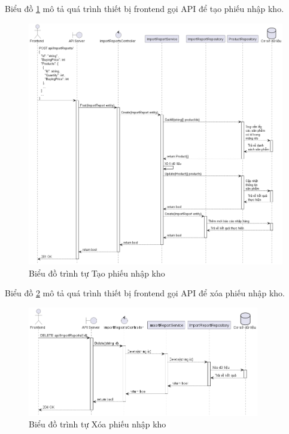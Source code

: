 \documentclass[../DoAn.tex]{subfiles}
\begin{document}
Biểu đồ \ref{figure:sd-importreport-post} mô tả quá trình thiết bị frontend gọi API để tạo phiếu nhập kho.
\begin{figure}[H]
    \centering
    \includegraphics[width=1\textwidth]{Hinhve/design/class/ImportReportPOSTSequence}
    \caption{Biểu đồ trình tự Tạo phiếu nhập kho}
    \label{figure:sd-importreport-post}
\end{figure}

Biểu đồ \ref{figure:sd-importreport-delete} mô tả quá trình thiết bị frontend gọi API để xóa phiếu nhập kho.
\begin{figure}[H]
    \centering
    \includegraphics[width=0.9\textwidth]{Hinhve/design/class/ImportReportDELETESequence}
    \caption{Biểu đồ trình tự Xóa phiếu nhập kho}
    \label{figure:sd-importreport-delete}
\end{figure}
\break
\end{document}
